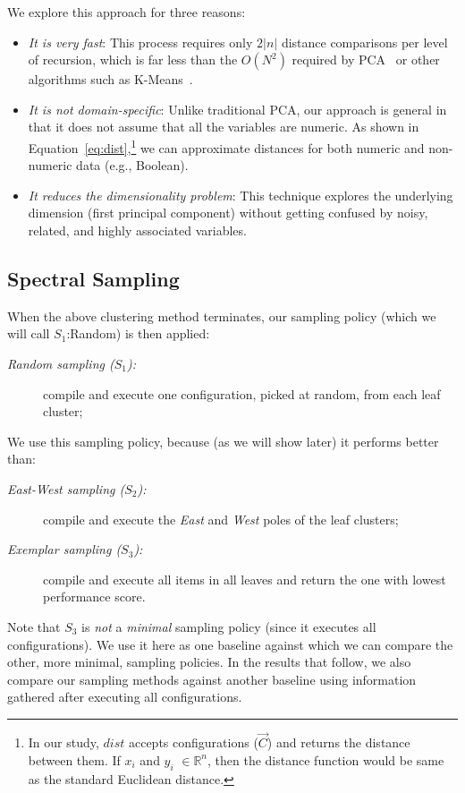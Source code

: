 \documentclass{newsig}
\begin{document}
We explore this approach for three reasons:
\begin{itemize}
\item
{\em It is very fast}:
This process requires only $2|n|$ distance comparisons
per level of recursion, which is far less than the $O(N^2)$
required by PCA~\cite{Du2008}
or other  algorithms such as K-Means~\cite{hamerly2010making}.
\item
{\em It is not domain-specific}:
Unlike traditional PCA, our approach is general in that it does not assume that all the variables are numeric. As shown in Equation~\ref{eq:dist},\footnote{In our study, $\mathit{dist}$ accepts configurations ($\vec{C}$) and returns the distance between them. If $x_i$ and $y_i$ $\in \mathbb{R}^n$, then the distance function would be same as the standard Euclidean distance.} we can approximate distances for both numeric and non-numeric data (e.g., Boolean).

\item
{\em It reduces the dimensionality problem}:
This technique explores the underlying dimension (first principal component) without getting confused by noisy, related, and highly associated variables.
\end{itemize}

\subsection{Spectral Sampling}\label{sect:sample}
When the above clustering method terminates, our  sampling policy (which we will call $S_1$:Random) is then applied:
\begin{description}
\item[{\em Random sampling ($S_1$):}] compile and execute one  configuration,  picked at random, from each leaf cluster;
\end{description}
We use this sampling policy, because (as we will show later) it performs better than:
\begin{description}
\item[{\em East-West sampling ($S_2$):}] compile and execute the {\em East} and {\em West} poles of the leaf clusters;
\item[{\em Exemplar sampling ($S_3$):}] compile and execute all items in all leaves and return the one
with lowest performance score.
\end{description}

Note that $S_3$ is {\em not} a {\em minimal} sampling policy (since it executes all configurations). 
We use it here as one  baseline
against which we can compare the other, more minimal, sampling policies. In the results
that follow, we also compare our 
sampling methods against another baseline using information gathered after executing
all configurations.
\end{document}
